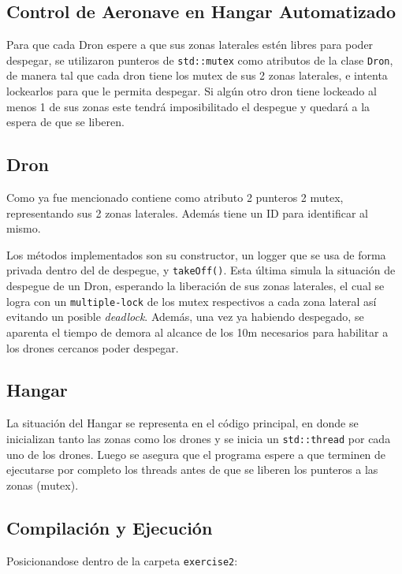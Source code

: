 \documentclass[11pt, a4paper]{article}
\begin{document}
\begin{multicols}{2}
\section{Control de Aeronave en Hangar Automatizado}

Para que cada Dron espere a que sus zonas laterales estén libres para poder despegar, se utilizaron punteros de \texttt{std::mutex} como atributos de la clase \texttt{Dron}, de manera tal que cada dron tiene los mutex de sus 2 zonas laterales, e intenta lockearlos para que le permita despegar. Si algún otro dron tiene lockeado al menos 1 de sus zonas este tendrá imposibilitado el despegue y quedará a la espera de que se liberen.

\subsection{Dron}

Como ya fue mencionado contiene como atributo 2 punteros 2 mutex, representando sus 2 zonas laterales. Además tiene un ID para identificar al mismo.

Los métodos implementados son su constructor, un logger que se usa de forma privada dentro del de despegue, y \texttt{takeOff()}. Esta última simula la situación de despegue de un Dron, esperando la liberación de sus zonas laterales, el cual se logra con un \texttt{multiple-lock} de los mutex respectivos a cada zona lateral así evitando un posible \textit{deadlock}. Además, una vez ya habiendo despegado, se aparenta el tiempo de demora al alcance de los 10m necesarios para habilitar a los drones cercanos poder despegar.

\subsection{Hangar}

La situación del Hangar se representa en el código principal, en donde se inicializan tanto las zonas como los drones y se inicia un \texttt{std::thread} por cada uno de los drones. Luego se asegura que el programa espere a que terminen de ejecutarse por completo los threads antes de que se liberen los punteros a las zonas (mutex).

\subsection{Compilación y Ejecución}

Posicionandose dentro de la carpeta \texttt{exercise2}:


\end{multicols}
\end{document}
